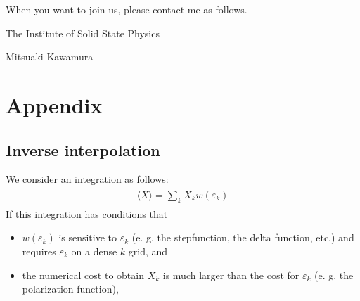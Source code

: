 \documentclass[letterpaper,10pt,pdftex,openany,english]{sphinxmanual}
\begin{document}
\sphinxAtStartPar
When you want to join us, please contact me as follows.

\sphinxAtStartPar
The Institute of Solid State Physics

\sphinxAtStartPar
Mitsuaki Kawamura

\sphinxAtStartPar
{}

\sphinxstepscope


\chapter{Appendix}
\label{\detokenize{app:appendix}}\label{\detokenize{app:app}}\label{\detokenize{app::doc}}

\section{Inverse interpolation}
\label{\detokenize{app:inverse-interpolation}}
\sphinxAtStartPar
We consider an integration as follows:
\begin{equation*}
\begin{split}\begin{align}
\langle X \rangle = \sum_{k} X_k w(\varepsilon_k)
\end{align}\end{split}
\end{equation*}
\sphinxAtStartPar
If this integration has conditions that
\begin{itemize}
\item {} 
\sphinxAtStartPar
\(w(\varepsilon_k)\) is sensitive to \(\varepsilon_k\) (e. g. the
stepfunction, the delta function, etc.) and requires
\(\varepsilon_k\) on a dense \(k\) grid, and

\item {} 
\sphinxAtStartPar
the numerical cost to obtain \(X_k\) is much larger than the cost for
\(\varepsilon_k\) (e. g. the polarization function),

\end{itemize}
\end{document}
